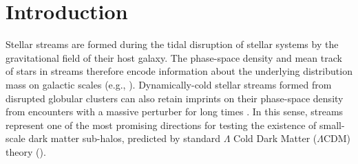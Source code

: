 \documentclass[modern]{aastex62}
\begin{document}

\section{Introduction}
\label{sec:intro}

Stellar streams are formed during the tidal disruption of stellar systems by the
gravitational field of their host galaxy.
The phase-space density and mean track of stars in streams therefore encode
information about the underlying distribution mass on galactic
scales (e.g., \citealt{Johnston:1999, Bonaca:2018}).
Dynamically-cold stellar streams formed from disrupted globular clusters can
also retain imprints on their phase-space density from encounters with a massive
perturber for long times \citep[e.g.,][]{Yoon:2011}.
In this sense, streams represent one of the most promising directions for
testing the existence of small-scale dark matter sub-halos, predicted by
standard $\Lambda$ Cold Dark Matter ($\Lambda$CDM) theory
(\citealt{Erkal:2015, Sanders:2016, Bovy:2017}).
\end{document}

